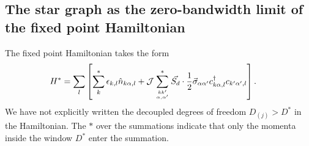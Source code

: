 \documentclass{iopart}
\begin{document}
\subsection{The star graph as the zero-bandwidth limit of the fixed point Hamiltonian}
\label{sec:star graph}
The fixed point Hamiltonian takes the form
\begin{eqnarray}
	H^* = \sum_l\left[ \sum^*_{k}\epsilon_{k,l} \hat n_{k\alpha,l} + {\mathcal{J}}\sum_{kk^\prime\atop{\alpha,\alpha^\prime}}^* \vec{S_d}\cdot\frac{1}{2}\vec{\sigma}_{\alpha\alpha^\prime}c_{k\alpha,l}^\dagger c_{k^\prime\alpha^\prime, l}\right].~ ~ ~ ~
\end{eqnarray}
We have not explicitly written the decoupled degrees of freedom \(D_{(j)} > D^*\) in the Hamiltonian. The \(*\) over the summations indicate that only the momenta inside the window \(D^*\) enter the summation.
\end{document}
